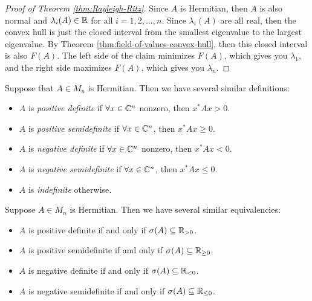 \begin{proof}[Proof of Theorem \ref{thm:Rayleigh-Ritz}]
Since $A$ is Hermitian, then $A$ is also normal and $\lambda_i(A) \in \mathbb R$ for all $i = 1, 2, \dots, n$. Since $\lambda_i(A)$ are all real, then the convex hull is just the closed interval from the smallest eigenvalue to the largest eigenvalue. By Theorem \ref{thm:field-of-values-convex-hull}, then this closed interval is also $F(A)$. The left side of the claim minimizes $F(A)$, which gives you $\lambda_1$, and the right side maximizes $F(A)$, which gives you $\lambda_n$.
\end{proof}

\begin{definition}
\label{def:semi-defs}
Suppose that $A \in M_n$ is Hermitian. Then we have several similar definitions:
\begin{itemize}
    \item $A$ is \textit{positive definite} if $\forall x \in \mathbb C^n$ nonzero, then $x^*Ax > 0$.
    \item $A$ is \textit{positive semidefinite} if $\forall x \in \mathbb C^n$, then $x^*Ax \geq 0$.
    \item $A$ is \textit{negative definite} if $\forall x \in \mathbb C^n$ nonzero, then $x^*Ax < 0$.
    \item $A$ is \textit{negative semidefinite} if $\forall x \in \mathbb C^n$, then $x^*Ax \leq 0$.
    \item $A$ is \textit{indefinite} otherwise.
\end{itemize}
\end{definition}

\begin{theorem}
\label{thm:eigs-definiteness}
Suppose $A \in M_n$ is Hermitian. Then we have several similar equivalencies:
\begin{itemize}
    \item $A$ is positive definite if and only if $\sigma(A) \subseteq \mathbb R_{> 0}$.
    \item $A$ is positive semidefinite if and only if $\sigma(A) \subseteq \mathbb R_{\geq 0}$.
    \item $A$ is negative definite if and only if $\sigma(A) \subseteq \mathbb R_{< 0}$.
    \item $A$ is negative semidefinite if and only if $\sigma(A) \subseteq \mathbb R_{\leq 0}$.
\end{itemize}
\end{theorem}

